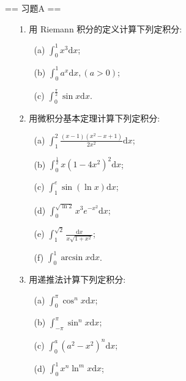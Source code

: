 \newenvironment{solution}{\begin{proofc}[解答]}{\end{proofc}}

== 习题A ==
\begin{enumerate}
    \item[1.]用 Riemann 积分的定义计算下列定积分:
    \begin{enumerate}
        \item[(a)]$\displaystyle \int_{0}^{1}x^{3}\mathrm{d}x$;
        \item[(b)]$\displaystyle \int_{0}^{1}a^{x}\mathrm{d}x,(a > 0)$;
        \item[(c)]$\displaystyle \int_{0}^{\frac{\pi}{2}}\sin x\mathrm{d}x$.
    \end{enumerate}
    \item[2.]用微积分基本定理计算下列定积分:
    \begin{enumerate}
        \item[(a)]$\displaystyle \int_{1}^{2}\frac{(x - 1)(x^{2} - x + 1)}{2x^{2}} \mathrm{d}x$;
        \item[(b)]$\displaystyle \int_{0}^{\frac{1}{2}}x(1 - 4x^{2})^{2}\mathrm{d}x$;
        \item[(c)]$\displaystyle \int_{1}^{e}\sin (\ln x)\mathrm{d}x$;
        \item[(d)]$\displaystyle \int_{0}^{\sqrt{\ln 2}}x^{3}e^{-x^{2}}\mathrm{d}x$;
        \item[(e)]$\displaystyle \int_{1}^{\sqrt{2}}\frac{\mathrm{d}x}{x\sqrt{1 + x^{2}}}$;
        \item[(f)]$\displaystyle \int_{0}^{1}\arcsin x\mathrm{d}x$.
    \end{enumerate}
    \item[3.]用递推法计算下列定积分:
    \begin{enumerate}
        \item[(a)]$\displaystyle \int_{0}^{\pi}\cos^{n}x \mathrm{d}x$;
        \item[(b)]$\displaystyle \int_{-\pi}^{\pi}\sin^{n}x \mathrm{d}x$;
        \item[(c)]$\displaystyle \int_{0}^{a}(a^{2} - x^{2})^{n}\mathrm{d}x$;
        \item[(d)]$\displaystyle \int_{0}^{1}x^{n}\ln^{m}x \mathrm{d}x$;

\end{enumerate}
\end{enumerate}
